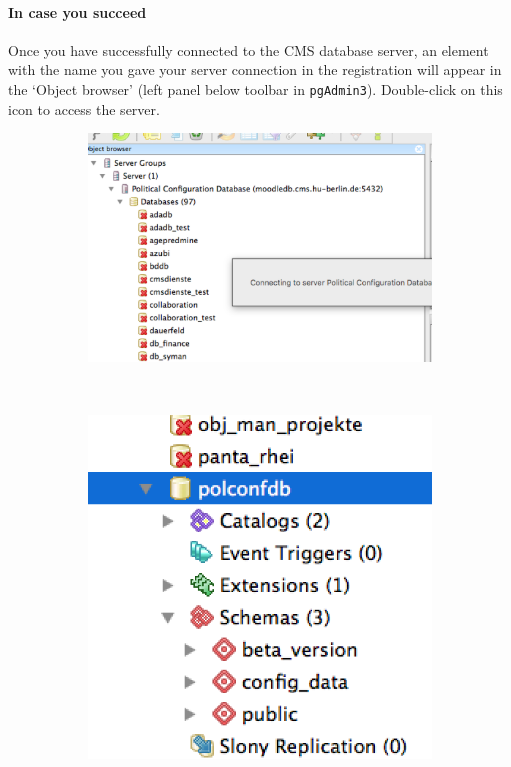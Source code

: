 \paragraph{In case you succeed}
Once you have successfully connected to the CMS database server, an element with the name you gave your server connection in the registration will appear in the `Object browser' (left panel below toolbar in \texttt{pgAdmin3}).  
Double-click on this icon to access the server. 

\begin{figure}[ht!]
\centering
  \begin{subfigure}{.45\textwidth}
  \includegraphics[width=\textwidth,trim= 0 0 0 0, clip]{pcdb_documentation_screenshots/pgadmin3_databases_on_server.png}
    \label{fig_pgadmin3_databases_on_server}
  \end{subfigure}
  ~%
  \begin{subfigure}{.45\textwidth}
  \includegraphics[width=\textwidth,trim= 0 0 0 0, clip]{pcdb_documentation_screenshots/pgadmin3_inside_pcdb.png}

\end{subfigure}
\end{figure}

